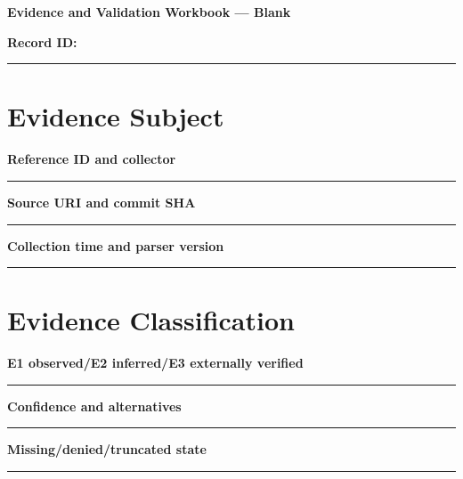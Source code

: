\documentclass[11pt,letterpaper]{article}
\begin{document}
\begin{center}{\LARGE\bfseries Evidence and Validation Workbook --- Blank}\par
\vspace{4pt}{\small Print-ready unfilled assessment instrument}\par
\end{center}
\noindent\textbf{Record ID:} \rule{2.6in}{0.4pt}\par
\section{Evidence Subject}
\noindent\textbf{Reference ID and collector}\par
\vspace{1.1em}\noindent\rule{0.96\linewidth}{0.4pt}\par\vspace{0.65em}
\noindent\textbf{Source URI and commit SHA}\par
\vspace{1.1em}\noindent\rule{0.96\linewidth}{0.4pt}\par\vspace{0.65em}
\noindent\textbf{Collection time and parser version}\par
\vspace{1.1em}\noindent\rule{0.96\linewidth}{0.4pt}\par\vspace{0.65em}
\section{Evidence Classification}
\noindent\textbf{E1 observed/E2 inferred/E3 externally verified}\par
\vspace{1.1em}\noindent\rule{0.96\linewidth}{0.4pt}\par\vspace{0.65em}
\noindent\textbf{Confidence and alternatives}\par
\vspace{1.1em}\noindent\rule{0.96\linewidth}{0.4pt}\par\vspace{0.65em}
\noindent\textbf{Missing/denied/truncated state}\par
\vspace{1.1em}\noindent\rule{0.96\linewidth}{0.4pt}\par\vspace{0.65em}
\end{document}
